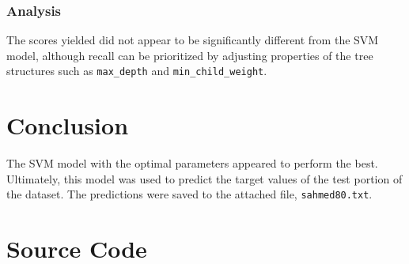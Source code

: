 \documentclass[11pt]{article}
\begin{document}
\subsubsection{Analysis}
The scores yielded did not appear to be significantly different from the SVM model, although recall can be prioritized by adjusting properties of the tree structures such as \texttt{max\_depth} and \texttt{min\_child\_weight}.

\section{Conclusion}
The SVM model with the optimal parameters appeared to perform the best. Ultimately, this model was used to predict the target values of the test portion of the dataset. The predictions were saved to the attached file, \texttt{sahmed80.txt}.




\appendix
{}%

\section{Source Code} \label{appendix:src}


\end{document}
